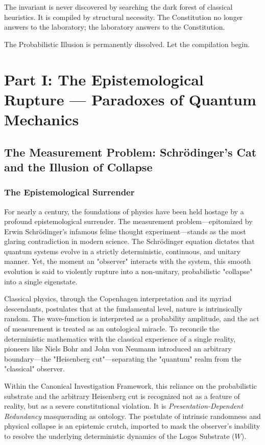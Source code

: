 \documentclass[12pt,twoside]{extbook}
\theoremstyle{definition}
\theoremstyle{remark}
\begin{document}
The invariant is never discovered by searching the dark forest of classical heuristics. It is compiled by structural necessity. The Constitution no longer answers to the laboratory; the laboratory answers to the Constitution.

The Probabilistic Illusion is permanently dissolved. Let the compilation begin.

\part*{Part I: The Epistemological Rupture --- Paradoxes of Quantum Mechanics}

\chapter{The Measurement Problem: Schrödinger's Cat and the Illusion of Collapse}

\section{The Epistemological Surrender}
For nearly a century, the foundations of physics have been held hostage by a profound epistemological surrender. The measurement problem—epitomized by Erwin Schrödinger’s infamous feline thought experiment—stands as the most glaring contradiction in modern science. The Schrödinger equation dictates that quantum systems evolve in a strictly deterministic, continuous, and unitary manner. Yet, the moment an "observer" interacts with the system, this smooth evolution is said to violently rupture into a non-unitary, probabilistic "collapse" into a single eigenstate.

Classical physics, through the Copenhagen interpretation and its myriad descendants, postulates that at the fundamental level, nature is intrinsically random. The wave-function is interpreted as a probability amplitude, and the act of measurement is treated as an ontological miracle. To reconcile the deterministic mathematics with the classical experience of a single reality, pioneers like Niels Bohr and John von Neumann introduced an arbitrary boundary—the "Heisenberg cut"—separating the "quantum" realm from the "classical" observer.

Within the Canonical Investigation Framework, this reliance on the probabilistic substrate and the arbitrary Heisenberg cut is recognized not as a feature of reality, but as a severe constitutional violation. It is \textit{Presentation-Dependent Redundancy} masquerading as ontology. The postulate of intrinsic randomness and physical collapse is an epistemic crutch, imported to mask the observer’s inability to resolve the underlying deterministic dynamics of the Logos Substrate ($W$).
\end{document}
